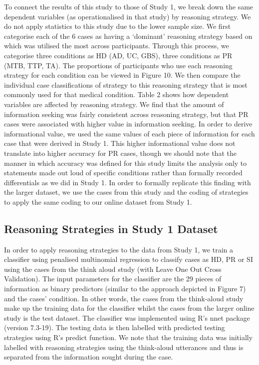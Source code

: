 \documentclass[a4paper, nobind]{templates/ociamthesis}
\begin{document}
To connect the results of this study to those of Study 1, we break down the same dependent variables (as operationalised in that study) by reasoning strategy. We do not apply statistics to this study due to the lower sample size. We first categorise each of the 6 cases as having a `dominant' reasoning strategy based on which was utilised the most across participants. Through this process, we categorise three conditions as HD (AD, UC, GBS), three conditions as PR (MTB, TTP, TA). The proportions of participants who use each reasoning strategy for each condition can be viewed in Figure 10. We then compare the individual case classifications of strategy to this reasoning strategy that is most commonly used for that medical condition. Table 2 shows how dependent variables are affected by reasoning strategy. We find that the amount of information seeking was fairly consistent across reasoning strategy, but that PR cases were associated with higher value in information seeking. In order to derive informational value, we used the same values of each piece of information for each case that were derived in Study 1. This higher informational value does not translate into higher accuracy for PR cases, though we should note that the manner in which accuracy was defined for this study limits the analysis only to statements made out loud of specific conditions rather than formally recorded differentials as we did in Study 1. In order to formally replicate this finding with the larger dataset, we use the cases from this study and the coding of strategies to apply the same coding to our online dataset from Study 1.

\hypertarget{reasoning-strategies-in-study-1-dataset}{%
\subsection*{Reasoning Strategies in Study 1 Dataset}\label{reasoning-strategies-in-study-1-dataset}}

In order to apply reasoning strategies to the data from Study 1, we train a classifier using penalised multinomial regression to classify cases as HD, PR or SI using the cases from the think aloud study (with Leave One Out Cross Validation). The input parameters for the classifier are the 29 pieces of information as binary predictors (similar to the approach depicted in Figure 7) and the cases' condition. In other words, the cases from the think-aloud study make up the training data for the classifier whilst the cases from the larger online study is the test dataset. The classifier was implemented using R's nnet package (version 7.3-19). The testing data is then labelled with predicted testing strategies using R's predict function. We note that the training data was initially labelled with reasoning strategies using the think-aloud utterances and thus is separated from the information sought during the case.
\end{document}
